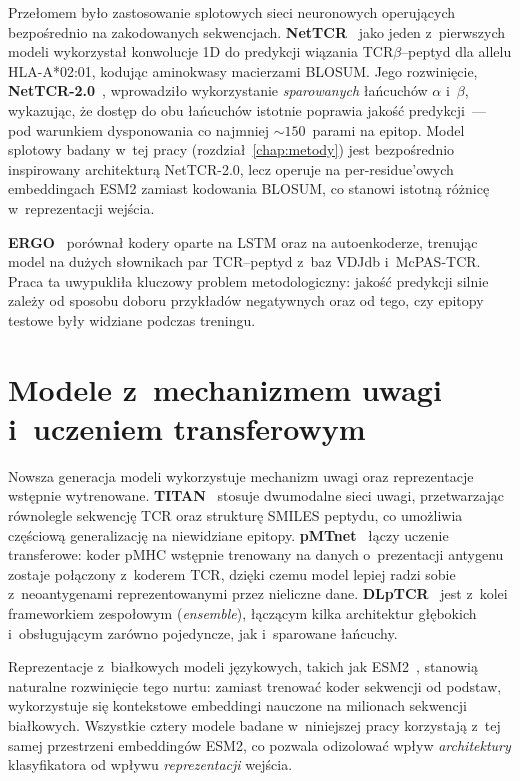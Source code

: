 \documentclass{SGGW-thesis}
\begin{document}
Przełomem było zastosowanie splotowych sieci neuronowych operujących bezpośrednio na zakodowanych
sekwencjach. \textbf{NetTCR}~\cite{jurtz2018} jako jeden z~pierwszych modeli wykorzystał konwolucje
1D do predykcji wiązania TCR$\beta$--peptyd dla allelu HLA-A*02:01, kodując aminokwasy macierzami
BLOSUM. Jego rozwinięcie, \textbf{NetTCR-2.0}~\cite{montemurro2022}, wprowadziło wykorzystanie
\textit{sparowanych} łańcuchów $\alpha$ i~$\beta$, wykazując, że dostęp do obu łańcuchów istotnie
poprawia jakość predykcji~--- pod warunkiem dysponowania co najmniej ${\sim}150$~parami na epitop.
Model splotowy badany w~tej pracy (rozdział~\ref{chap:metody}) jest bezpośrednio inspirowany
architekturą NetTCR-2.0, lecz operuje na per-residue'owych embeddingach ESM2 zamiast kodowania
BLOSUM, co stanowi istotną różnicę w~reprezentacji wejścia.

\textbf{ERGO}~\cite{springer2020} porównał kodery oparte na LSTM oraz na autoenkoderze, trenując
model na dużych słownikach par TCR--peptyd z~baz VDJdb i~McPAS-TCR. Praca ta uwypukliła kluczowy
problem metodologiczny: jakość predykcji silnie zależy od sposobu doboru przykładów negatywnych
oraz od tego, czy epitopy testowe były widziane podczas treningu.

\section{Modele z~mechanizmem uwagi i~uczeniem transferowym}

Nowsza generacja modeli wykorzystuje mechanizm uwagi oraz reprezentacje wstępnie wytrenowane.
\textbf{TITAN}~\cite{weber2021} stosuje dwumodalne sieci uwagi, przetwarzając równolegle sekwencję
TCR oraz strukturę SMILES peptydu, co umożliwia częściową generalizację na niewidziane epitopy.
\textbf{pMTnet}~\cite{lu2021} łączy uczenie transferowe: koder pMHC wstępnie trenowany na danych
o~prezentacji antygenu zostaje połączony z~koderem TCR, dzięki czemu model lepiej radzi sobie
z~neoantygenami reprezentowanymi przez nieliczne dane. \textbf{DLpTCR}~\cite{xu2021dlptcr} jest
z~kolei frameworkiem zespołowym (\textit{ensemble}), łączącym kilka architektur głębokich
i~obsługującym zarówno pojedyncze, jak i~sparowane łańcuchy.

Reprezentacje z~białkowych modeli językowych, takich jak ESM2~\cite{rives2021,lin2023}, stanowią
naturalne rozwinięcie tego nurtu: zamiast trenować koder sekwencji od podstaw, wykorzystuje się
kontekstowe embeddingi nauczone na milionach sekwencji białkowych. Wszystkie cztery modele badane
w~niniejszej pracy korzystają z~tej samej przestrzeni embeddingów ESM2, co pozwala odizolować wpływ
\textit{architektury} klasyfikatora od wpływu \textit{reprezentacji} wejścia.
\end{document}

